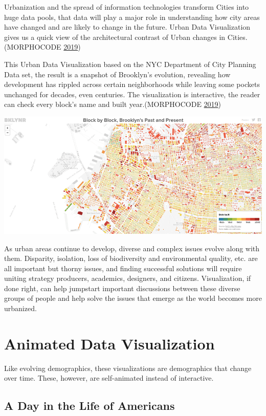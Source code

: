 \documentclass[]{book}
\begin{document}
Urbanization and the spread of information technologies transform Cities into huge data pools, that data will play a major role in understanding how city areas have changed and are likely to change in the future. Urban Data Visualization gives us a quick view of the architectural contrast of Urban changes in Cities. (MORPHOCODE \protect\hyperlink{ref-MORPHOCODE}{2019})

This Urban Data Visualization based on the NYC Department of City Planning Data set, the result is a snapshot of Brooklyn's evolution, revealing how development has rippled across certain neighborhoods while leaving some pockets unchanged for decades, even centuries. The visualization is interactive, the reader can check every block's name and built year.(MORPHOCODE \protect\hyperlink{ref-MORPHOCODE}{2019})

\includegraphics{images/urbanviz.png}

As urban areas continue to develop, diverse and complex issues evolve along with them. Disparity, isolation, loss of biodiversity and environmental quality, etc. are all important but thorny issues, and finding successful solutions will require uniting strategy producers, academics, designers, and citizens. Visualization, if done right, can help jumpstart important discussions between these diverse groups of people and help solve the issues that emerge as the world becomes more urbanized.

\hypertarget{animated-data-visualization}{%
\section{Animated Data Visualization}\label{animated-data-visualization}}

Like evolving demographics, these visualizations are demographics that change over time. These, however, are self-animated instead of interactive.

\hypertarget{a-day-in-the-life-of-americans}{%
\subsection{A Day in the Life of Americans}\label{a-day-in-the-life-of-americans}}
\end{document}
